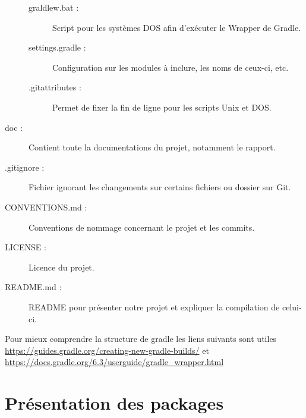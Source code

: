 \begin{description}
\begin{description}
				\item[graldlew.bat :]{Script pour les systèmes DOS afin d'exécuter le Wrapper de Gradle.}
				\item[settings.gradle :]{Configuration sur les modules à inclure, les noms de ceux-ci, etc.}
				\item[.gitattributes :]{Permet de fixer la fin de ligne pour les scripts Unix et DOS.}
			\end{description}
			\item[doc :]{Contient toute la documentations du projet, notamment le rapport.}
			\item[.gitignore :]{Fichier ignorant les changements sur certains fichiers ou dossier sur Git.}
			\item[CONVENTIONS.md :]{Conventions de nommage concernant le projet et les commits.}
			\item[LICENSE :]{Licence du projet.}
			\item[README.md :]{README pour présenter notre projet et expliquer la compilation de celui-ci.}
		\end{description}

		Pour mieux comprendre la structure de gradle les liens suivants sont utiles \url{https://guides.gradle.org/creating-new-gradle-builds/} et \url{https://docs.gradle.org/6.3/userguide/gradle_wrapper.html}

	\section{Présentation des packages}
